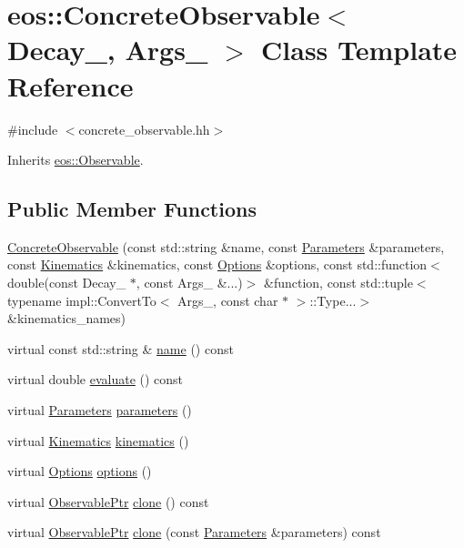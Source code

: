 \hypertarget{classeos_1_1ConcreteObservable}{
\section{eos::ConcreteObservable$<$ Decay\_\-, Args\_\- $>$ Class Template Reference}
\label{classeos_1_1ConcreteObservable}
}


{\ttfamily \#include $<$concrete\_\-observable.hh$>$}

Inherits \hyperlink{classeos_1_1Observable}{eos::Observable}.\subsection*{Public Member Functions}
\begin{DoxyCompactItemize}
\item 
\hyperlink{classeos_1_1ConcreteObservable_a194b98ae4633deff5c8d52d743efe6c3}{ConcreteObservable} (const std::string \&name, const \hyperlink{classeos_1_1Parameters}{Parameters} \&parameters, const \hyperlink{classeos_1_1Kinematics}{Kinematics} \&kinematics, const \hyperlink{classeos_1_1Options}{Options} \&options, const std::function$<$ double(const Decay\_\- $\ast$, const Args\_\- \&...)$>$ \&function, const std::tuple$<$ typename impl::ConvertTo$<$ Args\_\-, const char $\ast$ $>$::Type...$>$ \&kinematics\_\-names)
\item 
virtual const std::string \& \hyperlink{classeos_1_1ConcreteObservable_a777d479052396c8dc1b73f752fdb3539}{name} () const 
\item 
virtual double \hyperlink{classeos_1_1ConcreteObservable_a4127e180162b8f5eeebd55e7c8d1b7cf}{evaluate} () const 
\item 
virtual \hyperlink{classeos_1_1Parameters}{Parameters} \hyperlink{classeos_1_1ConcreteObservable_af5265ce9314987a7b7b01275b5410309}{parameters} ()
\item 
virtual \hyperlink{classeos_1_1Kinematics}{Kinematics} \hyperlink{classeos_1_1ConcreteObservable_abffd48fad6c67448f99c2024a6c81ad7}{kinematics} ()
\item 
virtual \hyperlink{classeos_1_1Options}{Options} \hyperlink{classeos_1_1ConcreteObservable_ac8f34b0c5dc087982bf0d7b053cf07b5}{options} ()
\item 
virtual \hyperlink{namespaceeos_a470e5dd806bd129080f1aa0c2954646f}{ObservablePtr} \hyperlink{classeos_1_1ConcreteObservable_af84f6c7410ff512dc8edb36f4501e389}{clone} () const 
\item 
virtual \hyperlink{namespaceeos_a470e5dd806bd129080f1aa0c2954646f}{ObservablePtr} \hyperlink{classeos_1_1ConcreteObservable_afe63f75a6814eda8dca5d1e842f71fc6}{clone} (const \hyperlink{classeos_1_1Parameters}{Parameters} \&parameters) const 
\end{DoxyCompactItemize}
